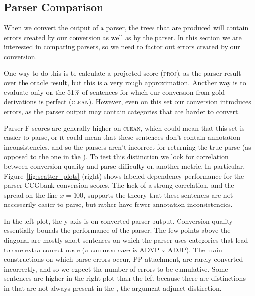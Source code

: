 \subsection{Parser Comparison}

When we convert the output of a \ccg parser, the \ptb trees that are produced
will contain errors created by our conversion as well as by the parser. In this
section we are interested in comparing parsers, so we need to factor out errors
created by our conversion.

One way to do this is to calculate a projected score (\textsc{proj}), as the
parser result over the oracle result, but this is a very rough approximation.
Another way is to evaluate only on the 51\% of sentences for which our
conversion from gold \ccg derivations is perfect (\textsc{clean}).  However,
even on this set our conversion introduces errors, as the parser output may
contain categories that are harder to convert.

Parser F-scores are generally higher on \textsc{clean}, which could mean that this
set is easier to parse, or it could mean that these sentences don't contain
annotation inconsistencies, and so the parsers aren't incorrect for returning
the true parse (as opposed to the one in the \ptb).  To test this distinction
we look for correlation between conversion quality and parse difficulty on
another metric.  In particular, Figure~\ref{fig:scatter_plots} (right) shows
\ccg labeled dependency performance for the \candc parser \myvs CCGbank
conversion \parseval scores. The lack of a strong correlation, and the spread
on the line $x=100$, supports the theory that these sentences are not
necessarily easier to parse, but rather have fewer annotation inconsistencies.

In the left plot, the y-axis is \parseval on converted \candc parser output.
Conversion quality essentially bounds the performance of the parser.
The few points above the diagonal are mostly short sentences on which the \candc parser uses categories that lead to one extra correct node (a common case is ADVP v ADJP).
The main constructions on which parse errors occur, \myeg PP attachment, are rarely converted incorrectly, and so we expect the number of errors to be cumulative.
Some sentences are higher in the right plot than the left because there are distinctions in \ccg that are not always present in the \ptb, \myeg the argument-adjunct distinction.

